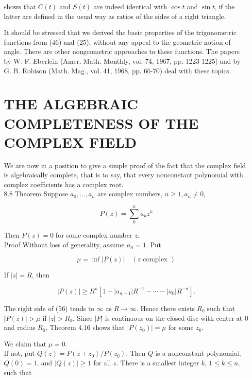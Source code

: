 \documentclass[10pt]{article}
\begin{document}
shows that $C(t)$ and $S(t)$ are indeed identical with $\cos t$ and $\sin t$, if the latter are defined in the usual way as ratios of the sides of a right triangle.

It should be stressed that we derived the basic properties of the trigonometric functions from (46) and (25), without any appeal to the geometric notion of angle. There are other nongeometric approaches to these functions. The papers by W. F. Eberlein (Amer. Math. Monthly, vol. 74, 1967, pp. 1223-1225) and by G. B. Robison (Math. Mag., vol. 41, 1968, pp. 66-70) deal with these topics.

\section*{THE ALGEBRAIC COMPLETENESS OF THE COMPLEX FIELD}
We are now in a position to give a simple proof of the fact that the complex field is algebraically complete, that is to say, that every nonconstant polynomial with complex coefficients has a complex root.\\
8.8 Theorem Suppose $a_{0}, \ldots, a_{n}$ are complex numbers, $n \geq 1, a_{n} \neq 0$,

$$
P(z)=\sum_{0}^{n} a_{k} z^{k}
$$

Then $P(z)=0$ for some complex number $z$.\\
Proof Without loss of generality, assume $a_{n}=1$. Put


\begin{equation*}
\mu=\inf |P(z)| \quad(z \text { complex }) \tag{55}
\end{equation*}


If $|z|=R$, then


\begin{equation*}
|P(z)| \geq R^{n}\left[1-\left|a_{n-1}\right| R^{-1}-\cdots-\left|a_{0}\right| R^{-n}\right] . \tag{56}
\end{equation*}


The right side of (56) tends to $\infty$ as $R \rightarrow \infty$. Hence there exists $R_{0}$ such that $|P(z)|>\mu$ if $|z|>R_{0}$. Since $|P|$ is continuous on the closed disc with center at 0 and radius $R_{0}$, Theorem 4.16 shows that $\left|P\left(z_{0}\right)\right|=\mu$ for some $z_{0}$.

We claim that $\mu=0$.\\
If not, put $Q(z)=P\left(z+z_{0}\right) / P\left(z_{0}\right)$. Then $Q$ is a nonconstant polynomial, $Q(0)=1$, and $|Q(z)| \geq 1$ for all $z$. There is a smallest integer $k$, $1 \leq k \leq n$, such that
\end{document}
